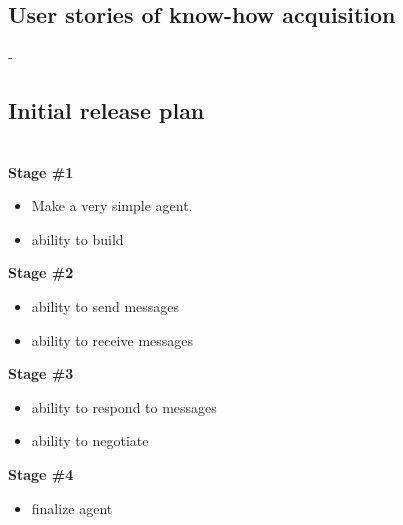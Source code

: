 \subsection{User stories of know-how acquisition}
-
\newpage
\subsection{Initial release plan}
\\

\textbf{Stage \#1}
\begin{itemize}
\item Make a very simple agent.
\item ability to build
\end{itemize}

\textbf{Stage \#2}
\begin{itemize}
\item ability to send messages
\item ability to receive messages
\end{itemize}

\textbf{Stage \#3}
\begin{itemize}
\item ability to respond to messages
\item ability to negotiate
\end{itemize}

\textbf{Stage \#4}
\begin{itemize}
\item finalize agent
\end{itemize}
